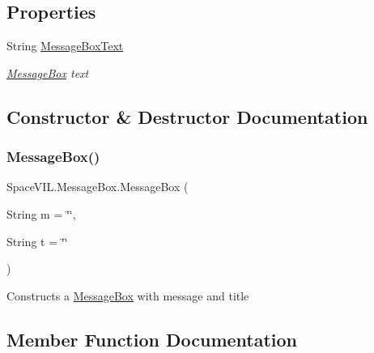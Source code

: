 \subsection*{Properties}
\begin{DoxyCompactItemize}
\item 
String \mbox{\hyperlink{class_space_v_i_l_1_1_message_box_a17b1d957b5a8835a4dc60b0e59067ab0}{Message\+Box\+Text}}
\begin{DoxyCompactList}\small\item\em \mbox{\hyperlink{class_space_v_i_l_1_1_message_box}{Message\+Box}} text \end{DoxyCompactList}\end{DoxyCompactItemize}


\subsection{Constructor \& Destructor Documentation}
\mbox{\label{class_space_v_i_l_1_1_message_box_a127851c5ef0b92c55134c37820b5e459}} 
\subsubsection{\texorpdfstring{Message\+Box()}{MessageBox()}}
{\footnotesize\ttfamily Space\+V\+I\+L.\+Message\+Box.\+Message\+Box (\begin{DoxyParamCaption}\item[{String}]{m = {\ttfamily \char`\"{}\char`\"{}},  }\item[{String}]{t = {\ttfamily \char`\"{}\char`\"{}} }\end{DoxyParamCaption})}



Constructs a \mbox{\hyperlink{class_space_v_i_l_1_1_message_box}{Message\+Box}} with message and title 



\subsection{Member Function Documentation}
\mbox{\label{class_space_v_i_l_1_1_message_box_ac14ecd2643e043c578ef4cf568887daf}} 
